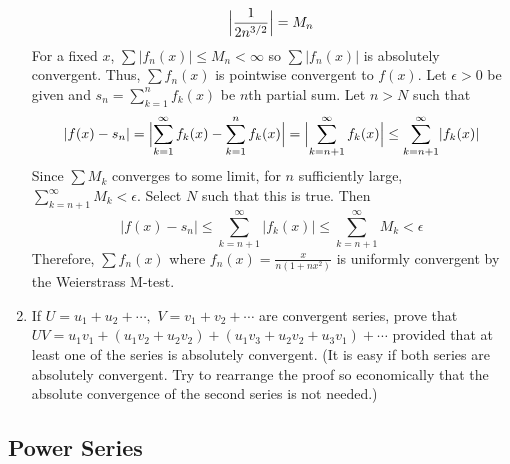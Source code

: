 \begin{enumerate}
\[  \Bigl\lvert\frac{1}{2n^{3/2}}\Bigr\rvert = M_n
  \]
  For a fixed \(x\), \(\sum\lvert f_n(x)\rvert\leq M_n < \infty\) so
  \(\sum\lvert f_n(x)\rvert\) is absolutely convergent.
  Thus, \(\sum f_n(x)\) is pointwise convergent to \(f(x)\).
  Let \(\epsilon > 0\) be given and \(s_n = \sum_{k = 1}^nf_k(x)\) be \(n\)th
  partial sum.
  Let \(n > N\) such that
  \[
  \lvert f(x) - s_n\rvert = \Bigl\lvert\sum_{k = 1}^{\infty}f_k(x) -
  \sum_{k = 1}^nf_k(x)\Bigr\rvert =
  \Bigl\lvert\sum_{k = n + 1}^{\infty}f_k(x)\Bigr\rvert\leq
  \sum_{k = n + 1}^{\infty}\lvert f_k(x)\rvert
  \]
  Since \(\sum M_k\) converges to some limit, for \(n\) sufficiently large,
  \(\sum_{k = n + 1}^{\infty}M_k < \epsilon\).
  Select \(N\) such that this is true.
  Then
  \[
  \lvert f(x) - s_n\rvert\leq\sum_{k = n + 1}^{\infty}\lvert f_k(x)\rvert\leq
  \sum_{k = n + 1}^{\infty}M_k < \epsilon
  \]
  Therefore, \(\sum f_n(x)\) where \(f_n(x) = \frac{x}{n(1 + nx^2)}\) is
  uniformly convergent by the Weierstrass M-test.
\item
  If \(U = u_1 + u_2 + \cdots,\) \(V = v_1 + v_2 + \cdots\) are convergent
  series, prove that
  \(UV = u_1v_1 + (u_1v_2 + u_2v_2) + (u_1v_3 + u_2v_2 + u_3v_1) + \cdots\)
  provided that at least one of the series is absolutely convergent.
  (It is easy if both series are absolutely convergent.
  Try to rearrange the proof so economically that the absolute convergence of
  the second series is not needed.)
\end{enumerate}

\subsection{Power Series}

